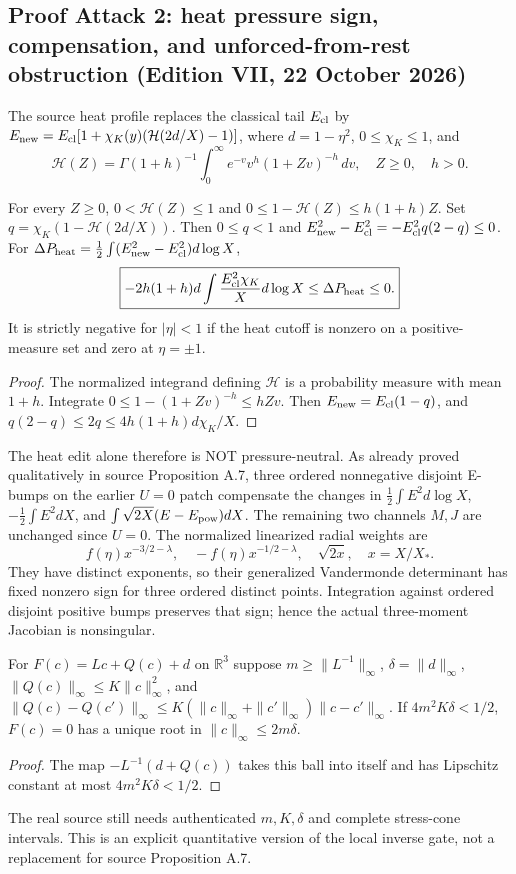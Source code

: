\subsection*{Proof Attack 2: heat pressure sign, compensation, and unforced-from-rest obstruction (Edition VII, 22 October 2026)}
\label{subsec:heat-pressure-compensation-VII}
The source heat profile replaces the classical tail
$E_{\rm cl}$ by $E_{\rm new}=E_{\rm cl}[1+\chi_K(y)(\mathcal H(2d/X)-1)]$,
where $d=1-\eta^2$, $0\le\chi_K\le1$, and
\[
\mathcal H(Z)=\Gamma(1+h)^{-1}\int_0^\infty
  e^{-v}v^h(1+Zv)^{-h}\,dv,\quad Z\ge0,\quad h>0.
\]
\begin{proposition}
For every $Z\ge0$, $0<\mathcal H(Z)\le1$ and
$0\le1-\mathcal H(Z)\le h(1+h)Z$.
Set $q=\chi_K(1-\mathcal H(2d/X))$.
Then $0\le q<1$ and
$E_{\rm new}^2-E_{\rm cl}^2=-E_{\rm cl}^2q(2-q)\le0$.
For $\Delta P_{\rm heat}=\frac12\int(E_{\rm new}^2-E_{\rm cl}^2)d\log X$,
\begin{equation}\label{eq:heat-defect-VII}
\boxed{-2h(1+h)d\int\frac{E_{\rm cl}^2\chi_K}{X}d\log X
\le\Delta P_{\rm heat}\le0.}
\end{equation}
It is strictly negative for $|\eta|<1$ if the heat cutoff
is nonzero on a positive-measure set and zero at $\eta=\pm1$.
\end{proposition}
\begin{proof}
The normalized integrand defining $\mathcal H$ is a
probability measure with mean $1+h$.
Integrate $0\le1-(1+Zv)^{-h}\le hZv$.
Then $E_{\rm new}=E_{\rm cl}(1-q)$,
and $q(2-q)\le2q\le4h(1+h)d\chi_K/X$.
\end{proof}
The heat edit alone therefore is NOT pressure-neutral.
As already proved qualitatively in source Proposition A.7,
three ordered nonnegative disjoint E-bumps on the earlier
$U=0$ patch compensate the changes in
$\frac12\int E^2d\log X$,
$-\frac12\int E^2dX$, and
$\int\sqrt{2X}(E-E_{\rm pow})dX$.
The remaining two channels $M,J$ are unchanged since $U=0$.
The normalized linearized radial weights are
\[
f(\eta)x^{-3/2-\lambda},\quad
-f(\eta)x^{-1/2-\lambda},\quad \sqrt{2x},\quad x=X/X_*.
\]
They have distinct exponents, so their generalized
Vandermonde determinant has fixed nonzero sign for
three ordered distinct points. Integration against
ordered disjoint positive bumps preserves that sign;
hence the actual three-moment Jacobian is nonsingular.
\begin{lemma}
For $F(c)=Lc+Q(c)+d$ on $\mathbb R^3$ suppose
$m\ge\|L^{-1}\|_\infty$, $\delta=\|d\|_\infty$,
$\|Q(c)\|_\infty\le K\|c\|_\infty^2$, and
$\|Q(c)-Q(c')\|_\infty\le
K(\|c\|_\infty+\|c'\|_\infty)\|c-c'\|_\infty$.
If $4m^2K\delta<1/2$, $F(c)=0$ has a unique root in
$\|c\|_\infty\le2m\delta$.
\end{lemma}
\begin{proof}
The map $-L^{-1}(d+Q(c))$ takes this ball into itself
and has Lipschitz constant at most $4m^2K\delta<1/2$.
\end{proof}
The real source still needs authenticated $m,K,\delta$
and complete stress-cone intervals. This is an
explicit quantitative version of the local inverse gate,
not a replacement for source Proposition A.7.
